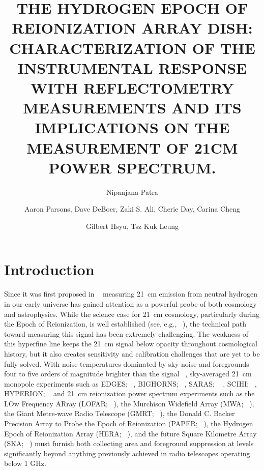 \documentclass[twocolumn]{emulateapj}
\begin{document}
\title{THE HYDROGEN EPOCH OF REIONIZATION ARRAY DISH: CHARACTERIZATION OF  THE INSTRUMENTAL RESPONSE WITH REFLECTOMETRY MEASUREMENTS AND ITS IMPLICATIONS ON THE MEASUREMENT OF 21CM POWER SPECTRUM. } 

\author{Nipanjana Patra }
\author{Aaron Parsons, Dave DeBoer, Zaki S. Ali, Cherie Day, Carina Cheng}
\author{Gilbert Hsyu, Tsz Kuk Leung}

\begin{abstract}
\end{abstract}


\section{\textbf{Introduction}}

Since it was first proposed in ~\citep{Shaver_et_al1999} measuring 21~cm
emission from neutral hydrogen in our early universe has gained attention as a
powerful probe of both cosmology and astrophysics.  While the science case for
21~cm cosmology, particularly during the Epoch of Reionization, is well
established (see, e.g.,
~\cite{furlanetto_et_al2006, morales_wyithe2010, pritchard_loeb2012}),
the technical path toward measuring this signal has been extremely challenging.  The
weakness of this hyperfine line keeps the 21~cm signal below opacity throughout
cosmological history, but it also creates sensitivity and calibration
challenges that are yet to be fully solved.  With noise temperatures dominated
by sky noise and foregrounds four to five orders of magnitude
brighter than the signal ~\citep{2015ApJ...801..138P}, 
sky-averaged 21~cm monopole experiments such as
EDGES; ~\citep{baars_et_al1977},
BIGHORNS; ~\citealt{XXX},
SARAS; ~\citep{Patra_et_al1999} ,
SCIHI; ~\citealt{2015PhDT........65V},
HYPERION; ~\citep{presley_et_al2015}
and 21~cm reionization power spectrum experiments such as
the LOw Frequency ARray (LOFAR; ~\citealt{XXX}),
the Murchison Widefield Array (MWA; ~\citealt{XXX}),
the Giant Metre-wave Radio Telescope (GMRT; ~\citealt{XXX}),
the Donald C. Backer Precision Array to Probe the Epoch of Reionization (PAPER; ~\citealt{parsons_et_al2010}),
the Hydrogen Epoch of Reionization Array (HERA; ~\citealt{XXX}),
and the future Square Kilometre Array (SKA; ~\citealt{XXX})
must
furnish both collecting area and foreground suppression at levels significantly
beyond anything previously achieved in radio telescopes operating below 1 GHz.
\end{document}
